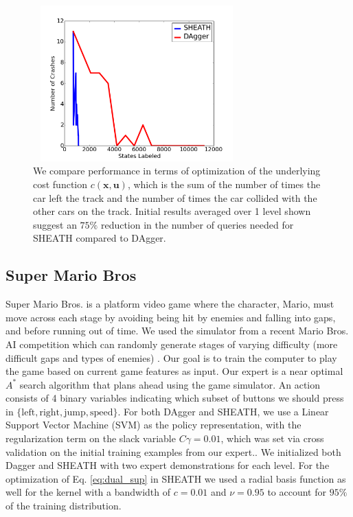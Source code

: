 \documentclass[10pt, conference]{ieeeconf}      %
\newcommand{\bu}{\mathbf{u}}
\newcommand{\bx}{\mathbf{x}}
\begin{document}
\begin{figure}[t!]
\centering
\includegraphics[width=8cm, height=6cm]{figures/dagger_sheath_no_cars.png}
\caption{ We compare performance in terms of optimization of the underlying cost function $c(\bx,\bu)$, which is the sum of the number of times the car left the track and the number of times the car collided with the other cars on the track. Initial results averaged over 1 level shown suggest an $75\%$ reduction in the number of queries needed for SHEATH compared to DAgger.   }

\vspace*{-10pt}
\label{fig:car_cost}
\end{figure}


\subsection{Super Mario Bros}
Super Mario Bros. is a platform video game where the character, Mario, must move across each stage by avoiding being hit by enemies and falling into gaps, and before running out of time. We used the simulator from a recent Mario Bros. AI competition which can randomly generate stages of varying difficulty (more difficult gaps and types of enemies) \cite{marioAI}. Our goal is to train the computer to play the game based on current game features as input. Our expert is a near optimal $A^*$ search algorithm that plans ahead using the game simulator. An action consists of 4 binary variables indicating which subset of buttons we should press in $\lbrace \mbox{left},\mbox{right},\mbox{jump},\mbox{speed} \rbrace$. For both DAgger and SHEATH, we use a Linear Support Vector Machine (SVM) as the policy representation, with the regularization term on the slack variable $C\gamma=0.01$, which was set via cross validation on the initial training examples from our expert.. We initialized both Dagger and SHEATH with two expert demonstrations for each level. For the optimization of Eq. \ref{eq:dual_sup} in SHEATH we used a radial basis function as well for the kernel with a bandwidth of $c=0.01$ and $\nu = 0.95$ to account for $95\%$ of the training distribution. 
\end{document}
